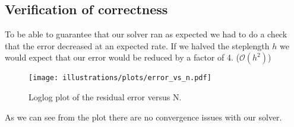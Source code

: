 
\subsection{Verification of correctness} %
\label{sub:verification_of_correctness}
To be able to guarantee that our solver ran as expected we had to do a check that the error decreased at an expected rate. If we halved the steplength $h$ we would expect that our error would be reduced by a factor of 4. ($\mathcal{O}(h^2)$)

\begin{figure}[htbp]
	\centering
	\texttt{[image: illustrations/plots/error\_vs\_n.pdf]}
	\caption{Loglog plot of the residual error versus N.}
	\label{fig:label}
\end{figure}

As we can see from the plot there are no convergence issues with our solver. 


